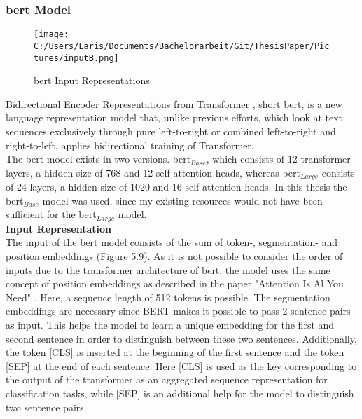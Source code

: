 \documentclass[a4paper, 11pt,titlepage,oneside,openany]{book}
\begin{document}
\subsubsection{\gls{bert} Model}
\begin{figure}[h]
	\centering
	\texttt{[image: C:/Users/Laris/Documents/Bachelorarbeit/Git/ThesisPaper/Pictures/inputB.png]}
	\caption{\gls{bert} Input Representations \cite{bert}}
\end{figure}
Bidirectional Encoder Representations from Transformer \cite{bert}, short \gls{bert}, is a new language representation model that, unlike previous efforts, which look at text sequences exclusively through pure left-to-right or combined left-to-right and right-to-left, applies bidirectional training of Transformer. \\
\noindent The \gls{bert} model exists in two versions. \gls{bert}$_{Base}$, which consists of 12 transformer layers, a hidden size of 768 and 12 self-attention heads, whereas \gls{bert}$_{Large}$ consists of 24 layers, a hidden size of 1020 and 16 self-attention heads. In this thesis the \gls{bert}$_{Base}$ model was used, since my existing resources would not have been sufficient for the \gls{bert}$_{Large}$ model.\\

\noindent \textbf{Input Representation} \\
\indent The input of the \gls{bert} model consists of the sum of token-, segmentation- and position embeddings (Figure 5.9). As it is not possible to consider the order of inputs due to the transformer architecture of \gls{bert}, the model uses the same concept of position embeddings as described in the paper "Attention Is Al You Need" \cite{attention}. Here, a sequence length of 512 tokens is possible. The segmentation embeddings are necessary since BERT makes it possible to pass 2 sentence pairs as input. This helps the model to learn a unique embedding for the first and second sentence in order to distinguish between these two sentences.  Additionally, the token [CLS] is inserted at the beginning of the first sentence and the token [SEP] at the end of each sentence. Here [CLS] is used as the key corresponding to the output of the transformer as an aggregated sequence representation for classification tasks, while [SEP] is an additional help for the model to distinguish two sentence pairs.\\
\end{document}
